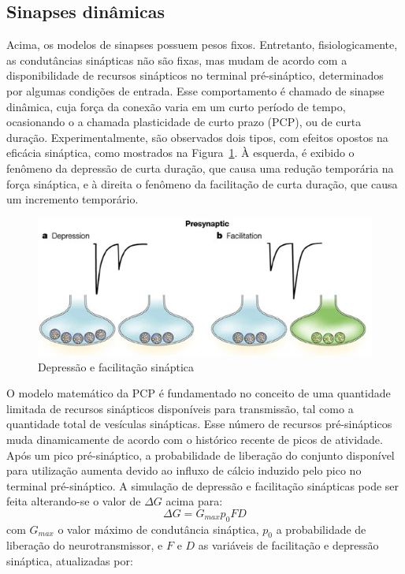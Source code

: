 \subsection{Sinapses dinâmicas}\label{subsec:sinapses_dinamicas}
Acima, os modelos de sinapses possuem pesos fixos. Entretanto, fisiologicamente, as condutâncias sinápticas não são fixas, mas mudam de acordo com a disponibilidade de recursos sinápticos no terminal pré-sináptico, determinados por algumas condições de entrada. Esse comportamento é chamado de sinapse dinâmica, cuja força da conexão varia em um curto período de tempo, ocasionando o a chamada plasticidade de curto prazo (PCP), ou de curta duração. Experimentalmente, são observados dois tipos, com efeitos opostos na eficácia sináptica, como mostrados na Figura~\ref{fig:plasticidadecurtaduracao}. À esquerda, é exibido o fenômeno da depressão de curta duração, que causa uma redução temporária na força sináptica, e à direita o fenômeno da facilitação de curta duração, que causa um incremento temporário.
\begin{figure}[tb]
	\centering
	\caption[Depressão e facilitação sináptica]{Depressão e facilitação sináptica}
	\label{fig:plasticidadecurtaduracao}
	\includegraphics[width=0.7\linewidth]{figs/plasticidade_curta_duracao}
\end{figure}
O modelo matemático da PCP é fundamentado no conceito de uma quantidade limitada de recursos sinápticos disponíveis para transmissão, tal como a quantidade total de vesículas sinápticas. Esse número de recursos pré-sinápticos muda dinamicamente de acordo com o histórico recente de picos de atividade. Após um pico pré-sináptico, a probabilidade de liberação do conjunto disponível para utilização aumenta devido ao influxo de cálcio induzido pelo pico no terminal pré-sináptico. A simulação de depressão e facilitação sinápticas pode ser feita alterando-se o valor de $\Delta G$ acima para:
\begin{equation}\label{eq:sinapse_facilitacao_depressao}
	\Delta G=G_{max}p_0FD
\end{equation}
com $G_{max}$ o valor máximo de condutância sináptica, $p_0$ a probabilidade de liberação do neurotransmissor, e $F$ e $D$ as variáveis de facilitação e depressão sináptica, atualizadas por:
